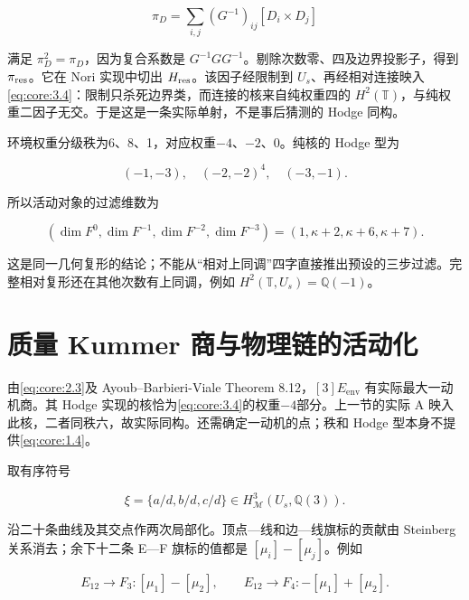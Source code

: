 \documentclass[11pt,a4paper,oneside]{ctexrep}
\theoremstyle{cnplain}
\theoremstyle{definition}
\theoremstyle{remark}
\begin{document}
\begin{equation}
\pi_D=\sum_{i,j}(G^{-1})_{ij}[D_i\times D_j]
\end{equation}

满足 \(\pi_D^2=\pi_D\)，因为复合系数是 \(G^{-1}GG^{-1}\)。剔除次数零、四及边界投影子，得到 \(\pi_{\rm res}\)。它在 Nori 实现中切出 \(H_{\rm res}\)。该因子经限制到 \(U_s\)、再经相对连接映入\eqref{eq:core:3.4}：限制只杀死边界类，而连接的核来自纯权重四的 \(H^2(\mathbb T)\)，与纯权重二因子无交。于是这是一条实际单射，不是事后猜测的 Hodge 同构。

环境权重分级秩为6、8、1，对应权重\(- 4\)、\(- 2\)、0。纯核的 Hodge 型为

\begin{equation}
(-1,-3),\quad(-2,-2)^4,\quad(-3,-1).
\end{equation}

所以活动对象的过滤维数为

\begin{equation}
(\dim F^0,\dim F^{-1},\dim F^{-2},\dim F^{-3})
                  =(1,\kappa+2,\kappa+6,\kappa+7).       \label{eq:core:3.5}
\end{equation}

这是同一几何复形的结论；不能从``相对上同调''四字直接推出预设的三步过滤。完整相对复形还在其他次数有上同调，例如 \(H^2(\mathbb T,U_s)=\mathbb Q(-1)\)。

\section{质量 Kummer 商与物理链的活动化}\label{sec:core:4}

由\eqref{eq:core:2.3}及 Ayoub--Barbieri-Viale Theorem 8.12，\([3] E_{\mathrm{env}}\) 有实际最大一动机商。其 Hodge 实现的核恰为\eqref{eq:core:3.4}的权重\(- 4\)部分。上一节的实际 A 映入此核，二者同秩六，故实际同构。还需确定一动机的点；秩和 Hodge 型本身不提供\eqref{eq:core:1.4}。

取有序符号

\begin{equation}
\xi=\{a/d,b/d,c/d\}\in H^3_{\mathcal M}(U_s,\mathbb Q(3)).
\end{equation}

沿二十条曲线及其交点作两次局部化。顶点---线和边---线旗标的贡献由 Steinberg 关系消去；余下十二条 E---F 旗标的值都是 \([\mu_i]-[\mu_j]\)。例如

\begin{equation}
E_{12}\to F_3:[\mu_1]-[\mu_2],\qquad
 E_{12}\to F_4:-[\mu_1]+[\mu_2].                         \label{eq:core:4.1}
\end{equation}
\end{document}
